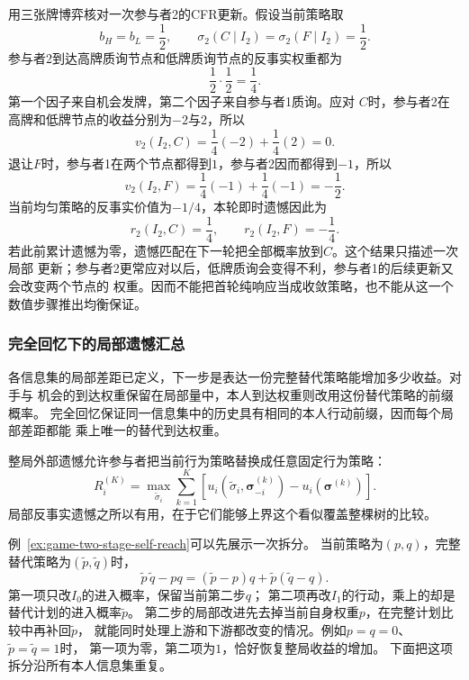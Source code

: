 用三张牌博弈核对一次参与者2的CFR更新。假设当前策略取
\[
  b_H=b_L=\frac12,\qquad
  \sigma_2(C\mid I_2)=\sigma_2(F\mid I_2)=\frac12.
\]
参与者2到达高牌质询节点和低牌质询节点的反事实权重都为
\[
  \frac12\cdot\frac12=\frac14.
\]
第一个因子来自机会发牌，第二个因子来自参与者1质询。应对
\(C\)时，参与者2在高牌和低牌节点的收益分别为\(-2\)与\(2\)，所以
\[
  v_2(I_2,C)
  =
  \frac14(-2)+\frac14(2)=0.
\]
退让\(F\)时，参与者1在两个节点都得到\(1\)，参与者2因而都得到\(-1\)，所以
\[
  v_2(I_2,F)
  =
  \frac14(-1)+\frac14(-1)=-\frac12.
\]
当前均匀策略的反事实价值为\(-1/4\)，本轮即时遗憾因此为
\[
  r_2(I_2,C)=\frac14,\qquad
  r_2(I_2,F)=-\frac14.
\]
若此前累计遗憾为零，遗憾匹配在下一轮把全部概率放到\(C\)。这个结果只描述一次局部
更新；参与者2更常应对以后，低牌质询会变得不利，参与者1的后续更新又会改变两个节点的
权重。因而不能把首轮纯响应当成收敛策略，也不能从这一个数值步骤推出均衡保证。

\subsubsection{完全回忆下的局部遗憾汇总}
\label{sec:game-perfect-recall-regret}

各信息集的局部差距已定义，下一步是表达一份完整替代策略能增加多少收益。对手与
机会的到达权重保留在局部量中，本人到达权重则改用这份替代策略的前缀概率。
完全回忆保证同一信息集中的历史具有相同的本人行动前缀，因而每个局部差距都能
乘上唯一的替代到达权重。

整局外部遗憾允许参与者把当前行为策略替换成任意固定行为策略：
\begin{equation}
  R_i^{(K)}
  =
  \max_{\widetilde{\sigma}_i}
  \sum_{k=1}^{K}
  \left[
    u_i(\widetilde{\sigma}_i,\bm{\sigma}_{-i}^{(k)})
    -
    u_i(\bm{\sigma}^{(k)})
  \right].
  \label{eq:game-extensive-external-regret}
\end{equation}
局部反事实遗憾之所以有用，在于它们能够上界这个看似覆盖整棵树的比较。

例~\ref{ex:game-two-stage-self-reach}可以先展示一次拆分。
当前策略为$(p,q)$，完整替代策略为$(\widetilde p,\widetilde q)$时，
\begin{equation}
 \widetilde p\,\widetilde q-pq
 =(\widetilde p-p)q+\widetilde p(\widetilde q-q).
 \label{eq:game-two-stage-deviation}
\end{equation}
第一项只改$I_0$的进入概率，保留当前第二步$q$；
第二项再改$I_1$的行动，乘上的却是替代计划的进入概率$\widetilde p$。
第二步的局部改进先去掉当前自身权重$p$，在完整计划比较中再补回$\widetilde p$，
就能同时处理上游和下游都改变的情况。例如$p=q=0$、$\widetilde p=\widetilde q=1$时，
第一项为零，第二项为$1$，恰好恢复整局收益的增加。
下面把这项拆分沿所有本人信息集重复。

